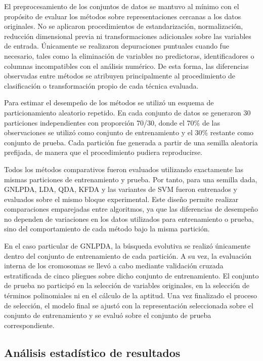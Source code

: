 El preprocesamiento de los conjuntos de datos se mantuvo al mínimo con el propósito de evaluar los métodos sobre representaciones cercanas a los datos originales. No se aplicaron procedimientos de estandarización, normalización, reducción dimensional previa ni transformaciones adicionales sobre las variables de entrada. Únicamente se realizaron depuraciones puntuales cuando fue necesario, tales como la eliminación de variables no predictoras, identificadores o columnas incompatibles con el análisis numérico. De esta forma, las diferencias observadas entre métodos se atribuyen principalmente al procedimiento de clasificación o transformación propio de cada técnica evaluada.

Para estimar el desempeño de los métodos se utilizó un esquema de particionamiento aleatorio repetido. En cada conjunto de datos se generaron 30 particiones independientes con proporción 70/30, donde el 70\% de las observaciones se utilizó como conjunto de entrenamiento y el 30\% restante como conjunto de prueba. Cada partición fue generada a partir de una semilla aleatoria prefijada, de manera que el procedimiento pudiera reproducirse.

Todos los métodos comparativos fueron evaluados utilizando exactamente las mismas particiones de entrenamiento y prueba. Por tanto, para una semilla dada, GNLPDA, LDA, QDA, KFDA y las variantes de SVM fueron entrenados y evaluados sobre el mismo bloque experimental. Este diseño permite realizar comparaciones emparejadas entre algoritmos, ya que las diferencias de desempeño no dependen de variaciones en los datos utilizados para entrenamiento o prueba, sino del comportamiento de cada método bajo la misma partición.

En el caso particular de GNLPDA, la búsqueda evolutiva se realizó únicamente dentro del conjunto de entrenamiento de cada partición. A su vez, la evaluación interna de los cromosomas se llevó a cabo mediante validación cruzada estratificada de cinco pliegues sobre dicho conjunto de entrenamiento. El conjunto de prueba no participó en la selección de variables originales, en la selección de términos polinomiales ni en el cálculo de la aptitud. Una vez finalizado el proceso de selección, el modelo final se ajustó con la representación seleccionada sobre el conjunto de entrenamiento y se evaluó sobre el conjunto de prueba correspondiente.


\subsection{Análisis estadístico de resultados}

